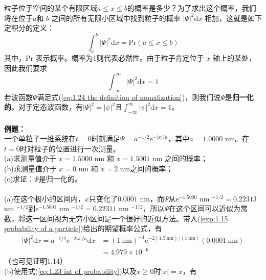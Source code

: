 	\indent 粒子位于空间的某个有限区域$a \le x \le b$的概率是多少？为了求出这个概率，我们将在位于$a$和 $b$ 之间的所有无限小区域中找到粒子的概率 $\left|\Psi\right|^2\mathrm{d}x$ 相加，这就是如下定积分的定义：
	\begin{equation}
		\boxed{\int_{a}^{b}\left|\Psi\right|^2 \mathrm{d}x = \text{Pr}\left(a \le x \le b\right)}
		\label{eq:1.23 int of probability}
	\end{equation}
	其中，Pr 表示概率。概率为1则代表必然性。由于粒子肯定位于 $x$ 轴上的某处，因此我们要求
	\begin{equation}
		\boxed{\int_{-\infty}^{\infty} \left|\Psi\right|^2 \mathrm{d}x = 1}
		\label{eq:1.24 the definition of nomalization}
	\end{equation}
	若波函数$\Psi$满足式(\ref{eq:1.24 the definition of nomalization})，则我们说$\Psi$是\textbf{归一化的}。对于定态波函数，有$\left|\Psi\right|^2 = \left|\psi\right|^2$且$\int_{-\infty}^{\infty} \left|\psi\right|^2 \mathrm{d}x = 1$。
	\\
	\\
\textbf{例题：}\\
	一个单粒子一维系统在$t=0$时刻满足$\Psi = a^{-1/2}\mathrm{e}^{-\left|x\right|/a}$，其中$a = 1.0000$ nm。在$t=0$时对粒子的位置进行一次测量。\\
	(a)求测量值介于 $x = 1.5000$ nm 和 $x = 1.5001$ nm 之间的概率；\\
	(b)求测量值介于 $x = 0$ nm 和 $x = 2$ nm之间的概率；\\
	(c)求证：$\Psi$是归一化的。\\
	\\
	(a)在这个极小的区间内，$x$只变化了$0.0001$ nm，而$\Psi$从$\mathrm{e}^{-1.5000}$ nm $^{-1/2} = 0.22313$ nm $^{-1/2}$到$\mathrm{e}^{-1.5001}$ nm $^{-1/2} = 0.22311$ nm $^{-1/2}$，所以$\Psi$在这个区间可以近似为常数，将这一区间视为无穷小区间是一个很好的近似方法。带入(\ref{exp:1.15 probability of a particle})给出的期望概率公式，有
	\begin{equation*}
		\begin{aligned}
			\left|\Psi\right|^2 \mathrm{d}x = a^{-1/2} \mathrm{e}^{-2\left|x\right|/a}\mathrm{d}x & = \left(1 \: \text{nm}\right)^{-1} \mathrm{e}^{-2\left(1.5 \: \text{nm}\right)/\left(1 \:\text{nm}\right)}\left(0.0001 \:\text{nm}\right)\\
			& = 4.979 \times 10^{-6}
		\end{aligned}
	\end{equation*}	
	（也可见证明1.14）\\
	(b)使用式(\ref{eq:1.23 int of probability})以及$x \ge 0$时$\left|x\right| = x$，有
